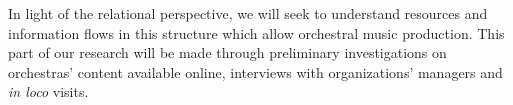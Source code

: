 \documentclass[a4paper, 12pt, openright, oneside, german, french, brazil, english]{abntex2}
\begin{document}
	In light of the relational perspective, we will seek to understand resources and information flows in this structure which allow orchestral music production. This part of our research will be made through preliminary investigations on orchestras' content available online, interviews with organizations' managers and \textit{in loco} visits.
	
\end{document}
